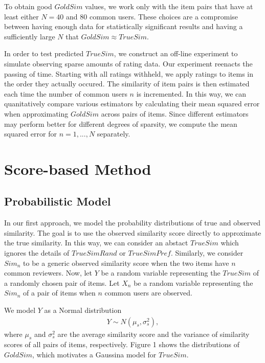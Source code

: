 \documentclass[11pt]{article}
\begin{document}
To obtain good $GoldSim$ values, we work only with the item pairs that have at 
least either $N=40$ and $80$ common users. These choices are a compromise 
between having enough data for statistically significant results and having 
a sufficiently large $N$ that $GoldSim \approx TrueSim$. 

In order to test predicted $TrueSim$, we construct an off-line experiment to
simulate observing sparse amounts of rating data. Our experiment reenacts  
the passing of time. Starting with all ratings withheld, we apply ratings to 
items in the order they actually occured. The similarity of item pairs is then
estimated each time the number of common users $n$ is incremented. In this way,
we can quanitatively compare various estimators by calculating their mean
squared error when approximating $GoldSim$ across pairs of items. Since 
different estimators may perform better for different degrees of sparsity, 
we compute the mean squared error for $n=1,...,N$ separately.

\section*{Score-based Method}
\subsection*{Probabilistic Model}

In our first approach, we model the probability distributions of true and 
observed similarity. The goal is to use the observed similarity score directly 
to approximate the true similarity. In this way, we can consider an abstact 
$TrueSim$ which ignores the details of $TrueSimRand$ or $TrueSimPref$. 
Similarly, we consider $Sim_n$ to be a generic observed similarity score when
the two items have $n$ common reviewers. Now, let $Y$ be a random variable 
representing the $TrueSim$ of a randomly chosen pair of items. Let $X_{n}$ be a
random variable representing the $Sim_{n}$ of a pair of items when $n$ common 
users are observed.

We model $Y$ as a Normal distribution 
\begin{align}
Y \sim N(\mu_s, \sigma_{s}^2),
\end{align}
where $\mu_s$ and $\sigma_{s}^2$ are the average similarity score and the variance
of similarity scores of all pairs of items, respectively. Figure 1 shows the
distributions of $GoldSim$, which motivates a Gaussina model for $TrueSim$.
\end{document}
